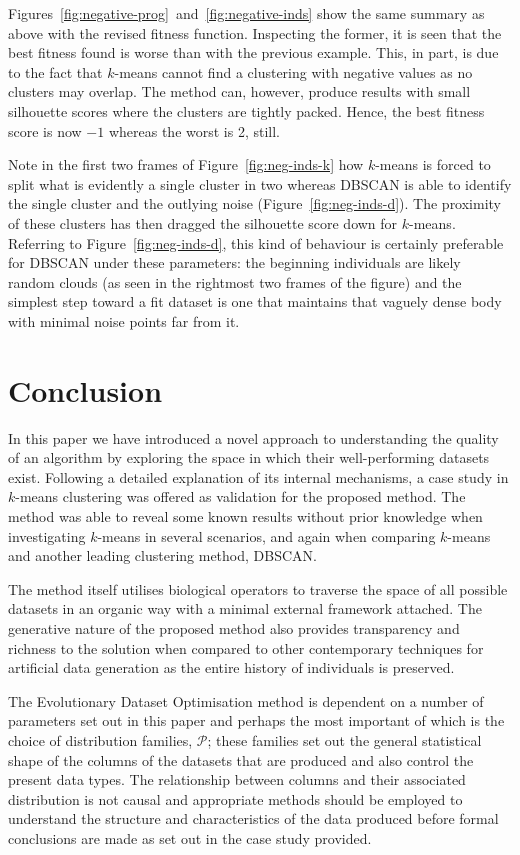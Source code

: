 \documentclass[smallextended]{svjour3}
\begin{document}
Figures~\ref{fig:negative-prog}~and~\ref{fig:negative-inds} show the same
summary as above with the revised fitness function. Inspecting the former, it is
seen that the best fitness found is worse than with the previous example. This,
in part, is due to the fact that \(k\)-means cannot find a clustering with
negative values as no clusters may overlap. The method can, however, produce
results with small silhouette scores where the clusters are tightly packed.
Hence, the best fitness score is now \(-1\) whereas the worst is 2, still.

Note in the first two frames of Figure~\ref{fig:neg-inds-k} how \(k\)-means is
forced to split what is evidently a single cluster in two whereas DBSCAN is able
to identify the single cluster and the outlying noise
(Figure~\ref{fig:neg-inds-d}). The proximity of these clusters has then dragged
the silhouette score down for \(k\)-means. Referring to
Figure~\ref{fig:neg-inds-d}, this kind of behaviour is certainly preferable for
DBSCAN under these parameters: the beginning individuals are likely random
clouds (as seen in the rightmost two frames of the figure) and the simplest step
toward a fit dataset is one that maintains that vaguely dense body with minimal
noise points far from it.


\section{Conclusion}

In this paper we have introduced a novel approach to understanding the quality
of an algorithm by exploring the space in which their well-performing datasets
exist. Following a detailed explanation of its internal mechanisms, a case study
in \(k\)-means clustering was offered as validation for the proposed method.
The method was able to reveal some known results without prior knowledge when
investigating \(k\)-means in several scenarios, and again when comparing
\(k\)-means and another leading clustering method, DBSCAN.\

The method itself utilises biological operators to traverse the space of all
possible datasets in an organic way with a minimal external framework attached.
The generative nature of the proposed method also provides transparency and
richness to the solution when compared to other contemporary techniques for
artificial data generation as the entire history of individuals is preserved.

The Evolutionary Dataset Optimisation method is dependent on a number of
parameters set out in this paper and perhaps the most important of which is the
choice of distribution families, \(\mathcal{P}\); these families set out the
general statistical shape of the columns of the datasets that are produced and
also control the present data types. The relationship between columns and their
associated distribution is not causal and appropriate methods should be
employed to understand the structure and characteristics of the data produced
before formal conclusions are made as set out in the case study provided.
\end{document}
